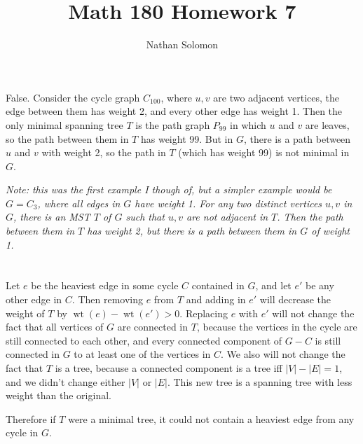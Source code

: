 \documentclass[12pt]{article}
\begin{document}
\title{Math 180 Homework 7}
\author{Nathan Solomon}
\maketitle

\section{}
\noindent{}\bigskip\par
False. Consider the cycle graph $C_{100}$, where $u,v$ are two adjacent vertices, the edge between them has weight 2, and every other edge has weight 1. Then the only minimal spanning tree $T$ is the path graph $P_{99}$ in which $u$ and $v$ are leaves, so the path between them in $T$ has weight 99. But in $G$, there is a path between $u$ and $v$ with weight 2, so the path in $T$ (which has weight 99) is not minimal in $G$.
\par
\textit{Note: this was the first example I though of, but a simpler example would be $G=C_3$, where all edges in $G$ have weight 1. For any two distinct vertices $u,v$ in $G$, there is an MST $T$ of $G$ such that $u,v$ are not adjacent in $T$. Then the path between them in $T$ has weight 2, but there is a path between them in $G$ of weight 1.}

\section{}
\noindent{}\bigskip\par
Let $e$ be the heaviest edge in some cycle $C$ contained in $G$, and let $e'$ be any other edge in $C$. Then removing $e$ from $T$ and adding in $e'$ will decrease the weight of $T$ by $ \operatorname{wt}(e)- \operatorname{wt}(e') > 0$. Replacing $e$ with $e'$ will not change the fact that all vertices of $G$ are connected in $T$, because the vertices in the cycle are still connected to each other, and every connected component of $G-C$ is still connected in $G$ to at least one of the vertices in $C$. We also will not change the fact that $T$ is a tree, because a connected component is a tree iff $|V|-|E|=1$, and we didn't change either $|V|$ or $|E|$. This new tree is a spanning tree with less weight than the original.
\par
Therefore if $T$ were a minimal tree, it could not contain a heaviest edge from any cycle in $G$.
\end{document}
